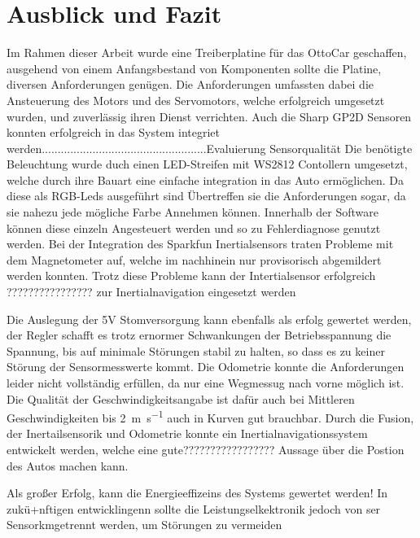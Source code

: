 \chapter{Ausblick und Fazit}

Im Rahmen dieser Arbeit wurde eine Treiberplatine für das OttoCar geschaffen, ausgehend von einem Anfangsbestand von Komponenten sollte die Platine, diversen Anforderungen genügen.
Die Anforderungen umfassten dabei die Ansteuerung des Motors und des Servomotors, welche erfolgreich umgesetzt wurden, und zuverlässig ihren Dienst verrichten.
Auch die Sharp GP2D Sensoren konnten erfolgreich in das System integriet werden....................................................Evaluierung Sensorqualität
Die benötigte Beleuchtung wurde duch einen LED-Streifen mit WS2812 Contollern umgesetzt, welche durch ihre Bauart eine einfache integration in das Auto ermöglichen.
Da diese als RGB-Leds ausgeführt sind Übertreffen sie die Anforderungen sogar, da sie nahezu jede mögliche Farbe Annehmen können. Innerhalb der Software können diese einzeln Angesteuert
werden und so zu Fehlerdiagnose genutzt werden. Bei der Integration des Sparkfun Inertialsensors traten Probleme mit dem Magnetometer auf, welche im nachhinein nur provisorisch abgemildert werden konnten.
Trotz diese Probleme kann der Intertialsensor erfolgreich ???????????????? zur Inertialnavigation eingesetzt werden %

Die Auslegung der 5V Stomversorgung kann ebenfalls als erfolg gewertet werden, der Regler schafft es trotz ernormer Schwankungen der Betriebsspannung die Spannung, bis auf minimale Störungen
stabil zu halten, so dass es zu keiner Störung der Sensormesswerte kommt. Die Odometrie konnte die Anforderungen leider nicht vollständig erfüllen, da nur eine Wegmessug nach vorne möglich ist.
Die Qualität der Geschwindigkeitsangabe ist dafür auch bei Mittleren Geschwindigkeiten bis \SI{2}{\metre\per\second} auch in Kurven gut brauchbar. Durch die Fusion, der
Inertailsensorik und Odometrie konnte ein Inertialnavigationssystem
entwickelt werden, welche eine gute????????????????? Aussage über die Postion des Autos machen kann.

Als großer Erfolg, kann die Energieeffizeins des Systems gewertet werden! 
In zukü+nftigen entwicklingenn sollte die Leistungselkektronik jedoch von ser Sensorkmgetrennt werden, um Störungen zu vermeiden

